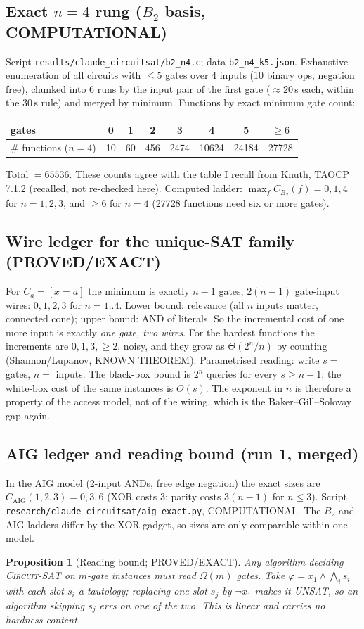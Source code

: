 \documentclass[11pt]{article}
\newtheorem{prop}{Proposition}
\newcommand{\SAT}{\textsc{Circuit-SAT}}
\begin{document}
\subsection{Exact $n=4$ rung ($B_2$ basis, COMPUTATIONAL)}
Script \texttt{results/claude\_circuitsat/b2\_n4.c}; data \texttt{b2\_n4\_k5.json}. Exhaustive enumeration of all
circuits with $\le5$ gates over 4 inputs (10 binary ops, negation free), chunked into 6 runs by the input pair of the
first gate ($\approx20$\,s each, within the 30\,s rule) and merged by minimum. Functions by exact minimum gate count:
\begin{center}\begin{tabular}{@{}lccccccc@{}}\toprule
gates & 0 & 1 & 2 & 3 & 4 & 5 & $\ge6$\\\midrule
$\#$ functions ($n=4$) & 10 & 60 & 456 & 2474 & 10624 & 24184 & 27728\\\bottomrule\end{tabular}\end{center}
Total $=65536$. These counts agree with the table I recall from Knuth, TAOCP 7.1.2 (recalled, not re-checked
here). Computed ladder:
$\max_f C_{B_2}(f)=0,1,4$ for $n=1,2,3$, and $\ge6$ for $n=4$ (27728 functions need six or more gates).

\subsection{Wire ledger for the unique-SAT family (PROVED/EXACT)}
For $C_a=[x=a]$ the minimum is exactly $n-1$ gates, $2(n-1)$ gate-input wires: $0,1,2,3$ for $n=1..4$.
Lower bound: relevance (all $n$ inputs matter, connected cone); upper bound: AND of literals. So the
incremental cost of one more input is exactly \emph{one gate, two wires}. For the hardest functions the
increments are $0,1,3,\ge2$, noisy, and they grow as $\Theta(2^n/n)$ by counting (Shannon/Lupanov, KNOWN THEOREM).
Parametrised reading: write $s=$ gates, $n=$ inputs. The black-box bound is $2^n$ queries for every $s\ge n-1$;
the white-box cost of the same instances is $O(s)$. The exponent in $n$ is therefore a property of the access model,
not of the wiring, which is the Baker--Gill--Solovay gap again.

\subsection{AIG ledger and reading bound (run 1, merged)}
In the AIG model (2-input ANDs, free edge negation) the exact sizes are $C_{\mathrm{AIG}}(1,2,3)=0,3,6$
(XOR costs 3; parity costs $3(n-1)$ for $n\le3$). Script \texttt{research/claude\_circuitsat/aig\_exact.py},
COMPUTATIONAL. The $B_2$ and AIG ladders differ by the XOR gadget, so sizes are only comparable within one model.
\begin{prop}[Reading bound; PROVED/EXACT] Any algorithm deciding \SAT{} on $m$-gate instances must read $\Omega(m)$ gates.
Take $\varphi=x_1\wedge\bigwedge_i s_i$ with each slot $s_i$ a tautology; replacing one slot $s_j$ by $\neg x_1$ makes it UNSAT, so
an algorithm skipping $s_j$ errs on one of the two. This is linear and carries no hardness content.
\end{prop}
\end{document}
